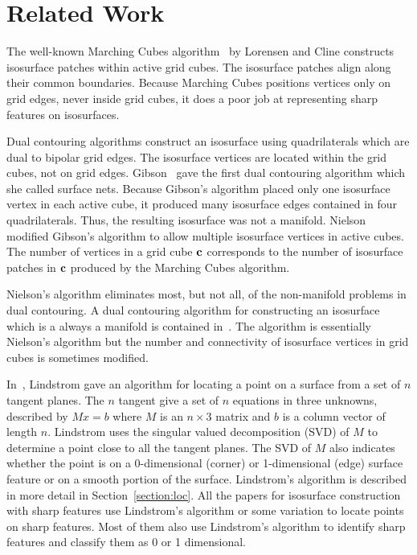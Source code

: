\section{Related Work}
\label{section:related}

The well-known Marching Cubes algorithm~\cite{lc-mchr3-87}
by Lorensen and Cline
constructs isosurface patches within active grid cubes.
The isosurface patches align along their common boundaries.
Because Marching Cubes positions vertices only on grid edges,
never inside grid cubes,
it does a poor job at representing sharp features on isosurfaces.

Dual contouring algorithms construct an isosurface using quadrilaterals
which are dual to bipolar grid edges.
The isosurface vertices are located within the grid cubes,
not on grid edges.
Gibson~\cite{gh-ssqem-97,g-cesng-98} gave the first dual contouring algorithm
which she called surface nets.
Because Gibson's algorithm placed only one isosurface vertex 
in each active cube,
it produced many isosurface edges contained in four quadrilaterals.
Thus, the resulting isosurface was not a manifold.
Nielson~\cite{n-dmc-04} modified Gibson's algorithm
to allow multiple isosurface vertices in active cubes.
The number of vertices in a grid cube $\mathbf{c}$
corresponds to the number of isosurface patches in $\mathbf{c}$
produced by the Marching Cubes algorithm.

Nielson's algorithm eliminates most, but not all, 
of the non-manifold problems in dual contouring.
A dual contouring algorithm
for constructing an isosurface which is a always a manifold
is contained in~\cite{Wenger:2013:Isosurfaces}.
The algorithm is essentially Nielson's algorithm
but the number and connectivity of isosurface vertices in grid cubes
is sometimes modified.

In~\cite{l-oslpm-00}, Lindstrom gave an algorithm for locating a point 
on a surface from a set of $n$ tangent planes.
The $n$ tangent give a set of $n$ equations in three unknowns,
described by $M x = b$ where $M$ is an $n \times 3$ matrix 
and $b$ is a column vector of length $n$.
Lindstrom uses the singular valued decomposition (SVD) of $M$
to determine a point close to all the tangent planes.
The SVD of $M$ also indicates whether the point is
on a 0-dimensional (corner) or 1-dimensional (edge) surface feature
or on a smooth portion of the surface.
Lindstrom's algorithm is described in more detail 
in Section~\ref{section:loc}.
All the papers for isosurface construction with sharp features
use Lindstrom's algorithm or some variation
to locate points on sharp features.
Most of them also use Lindstrom's algorithm to identify sharp features
and classify them as 0 or 1 dimensional.

